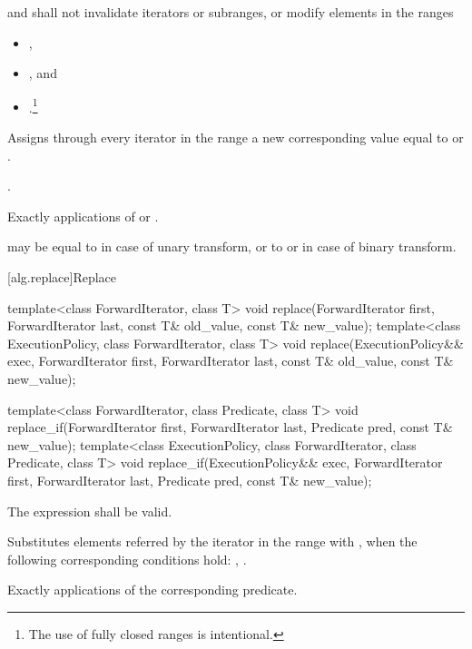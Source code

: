 \begin{itemdescr}
\pnum
\requires
{} and 
shall not invalidate iterators or subranges, or modify elements in the ranges
\begin{itemize}
\item {},
\item {}, and
\item {}.\footnote{The use of fully
closed ranges is intentional.}
\end{itemize}

\pnum
\effects
Assigns through every iterator
in the range
a new
corresponding value equal to
or
.

\pnum
\returns
{}.

\pnum
\complexity
Exactly
applications of
 or .

\pnum
\remarks
{} may be equal to 
in case of unary transform,
or to  or 
in case of binary transform.
\end{itemdescr}

[alg.replace]{Replace}

%
%
\begin{itemdecl}
template<class ForwardIterator, class T>
  void replace(ForwardIterator first, ForwardIterator last,
               const T& old_value, const T& new_value);
template<class ExecutionPolicy, class ForwardIterator, class T>
  void replace(ExecutionPolicy&& exec,
               ForwardIterator first, ForwardIterator last,
               const T& old_value, const T& new_value);

template<class ForwardIterator, class Predicate, class T>
  void replace_if(ForwardIterator first, ForwardIterator last,
                  Predicate pred, const T& new_value);
template<class ExecutionPolicy, class ForwardIterator, class Predicate, class T>
  void replace_if(ExecutionPolicy&& exec,
                  ForwardIterator first, ForwardIterator last,
                  Predicate pred, const T& new_value);
\end{itemdecl}

\begin{itemdescr}
\pnum
\requires
The expression
shall be valid.

\pnum
\effects
Substitutes elements referred by the iterator
in the range 
with ,
when the following corresponding conditions hold:
, .

\pnum
\complexity
Exactly
applications of the corresponding predicate.
\end{itemdescr}

